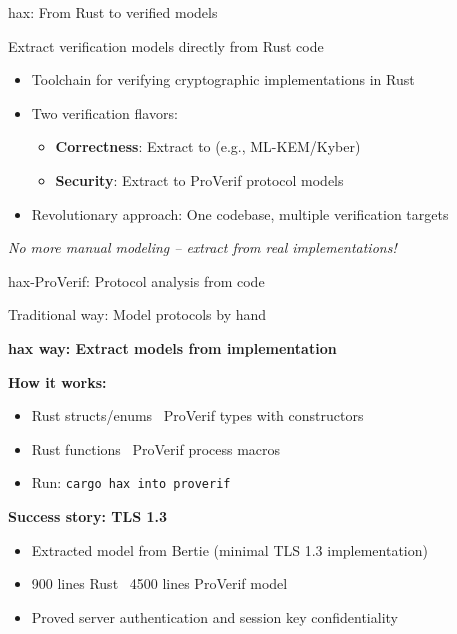 \documentclass[aspectratio=169, lualatex, handout]{beamer}
\begin{document}
\begin{frame}{hax: From Rust to verified models}
	\begin{center}
		\Large
		Extract verification models directly from Rust code
	\end{center}
	\vspace{1em}
	\begin{itemize}
		\item Toolchain for verifying cryptographic implementations in Rust
		\item Two verification flavors:
		      \begin{itemize}
			      \item \textbf{Correctness}: Extract to \fstar (e.g., ML-KEM/Kyber)
			      \item \textbf{Security}: Extract to ProVerif protocol models
		      \end{itemize}
		\item Revolutionary approach: One codebase, multiple verification targets
	\end{itemize}
	\vspace{0.5em}
	\begin{center}
		\textit{No more manual modeling – extract from real implementations!}
	\end{center}
\end{frame}

\begin{frame}{hax-ProVerif: Protocol analysis from code}
	\begin{center}
		\Large
		Traditional way: Model protocols by hand

		\vspace{0.5em}

		\textbf{hax way: Extract models from implementation}
	\end{center}
	\vspace{1em}
	\textbf{How it works:}
	\begin{itemize}
		\item Rust structs/enums \rightarrow\ ProVerif types with constructors
		\item Rust functions \rightarrow\ ProVerif process macros
		\item Run: \texttt{cargo hax into proverif}
	\end{itemize}
	\vspace{0.5em}
	\textbf{Success story: TLS 1.3}
	\begin{itemize}
		\item Extracted model from Bertie (minimal TLS 1.3 implementation)
		\item 900 lines Rust \rightarrow\ 4500 lines ProVerif model
		\item Proved server authentication and session key confidentiality
	\end{itemize}
\end{frame}
\end{document}
